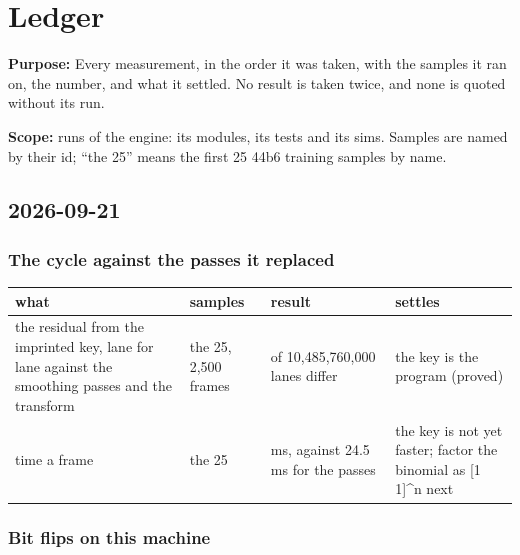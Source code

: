 \chapter{\texorpdfstring{Ledger}{Ledger}}
\label{chap:ledger}

\textbf{Purpose:} Every measurement, in the order it was taken, with the samples it ran on, the number, and what it settled. No result is taken twice, and none is quoted without its run.

\textbf{Scope:} runs of the engine: its modules, its tests and its sims. Samples are named by their id; “the 25” means the first 25 44b6 training samples by name.

\section{\texorpdfstring{2026-09-21}{2026-09-21}}

\subsection{\texorpdfstring{The cycle against the passes it replaced}{The cycle against the passes it replaced}}

{\footnotesize
\setlength{\tabcolsep}{6pt}
\begin{longtable}{>{\RaggedRight\arraybackslash}p{}>{\RaggedRight\arraybackslash}p{}>{\RaggedRight\arraybackslash}p{}>{\RaggedRight\arraybackslash}p{}}
\toprule
what & samples & result & settles \\
\midrule
\endhead
the residual from the imprinted key, lane for lane against the smoothing passes and the transform & the 25, 2,500 frames & 0 of 10,485,760,000 lanes differ & the key is the program (proved) \\
time a frame & the 25 & 31 ms, against 24.5 ms for the passes & the key is not yet faster; factor the binomial as [1 1]\textasciicircum{}n next \\
\bottomrule
\end{longtable}
}

\subsection{\texorpdfstring{Bit flips on this machine}{Bit flips on this machine}}

